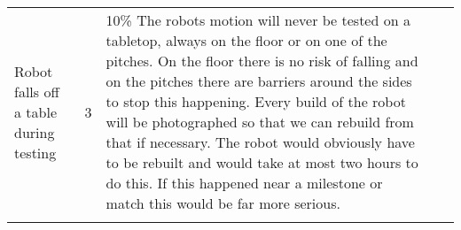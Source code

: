 \documentclass{article}
\begin{document}
\begin{landscape}
\begin{tabular}{ p{4cm}  p{2cm} p{2cm} p{4cm} p{4cm} }
        Robot falls off a table during testing &
        3&
        10\%
        The robots motion will never be tested on a tabletop, always on the
        floor or on one of the pitches. On the floor there is no risk of
        falling and on the pitches there are barriers around the sides to stop
        this happening. Every build of the robot will be photographed so that
        we can rebuild from that if necessary.
        The robot would obviously have to be rebuilt and would take at most two
        hours to do this. If this happened near a milestone or match this would
        be far more serious.\\
        \\


        



    \end{tabular}
\end{landscape}
\end{document}
